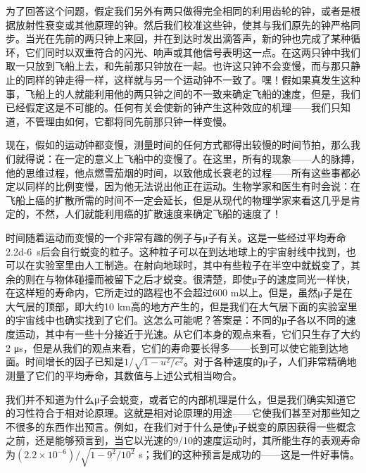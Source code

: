 \documentclass[12pt,oneside]{book}
\begin{document}
为了回答这个问题，假定我们另外有两只做得完全相同的利用齿轮的钟，或者是根据放射性衰变或其他原理的钟。然后我们校准这些钟，使其与我们原先的钟严格同步。当光在先前的两只钟上来回，并在到达时发出滴答声，新的钟也完成了某种循环，它们同时以双重符合的闪光、响声或其他信号表明这一点。在这两只钟中我们取一只放到飞船上去，和先前那只钟放在一起。也许这只钟不会变慢，而与那只静止的同样的钟走得一样，这样就与另一个运动钟不一致了。嘿！假如果真发生这种事，飞船上的人就能利用他的两只钟之间的不一致来确定飞船的速度，但是，我们已经假定这是不可能的。任何有关会使新的钟产生这种效应的机理——我们只知道，不管理由如何，它都将同先前那只钟一样变慢。

现在，假如的运动钟都变慢，测量时间的任何方式都得出较慢的时间节拍，那么我们就得说：在一定的意义上飞船中的变慢了。在这里，所有的现象——人的脉搏，他的思维过程，他点燃雪茄烟的时间，以致他成长衰老的过程——所有这些事都必定以同样的比例变慢，因为他无法说出他正在运动。生物学家和医生有时会说：在飞船上癌的扩散所需的时间不一定会延长，但是从现代的物理学家来看这几乎是肯定的，不然，人们就能利用癌的扩散速度来确定飞船的速度了！

时间随着运动而变慢的一个非常有趣的例子与μ子有关。这是一些经过平均寿命\qty{2.2d-6}{s}后会自行蜕变的粒子。这种粒子可以在到达地球上的宇宙射线中找到，也可以在实验室里由人工制造。在射向地球时，其中有些粒子在半空中就蜕变了，其余的则在与物体碰撞而被留下之后才蜕变。很清楚，即使μ子的速度同光一样快，在这样短的寿命内，它所走过的路程也不会超过600 m以上。但是，虽然μ子是在大气层的顶部，即大约10 km高的地方产生的，但是我们在大气层下面的实验室里的宇宙线中也确实找到了它们。这怎么可能呢？答案是：不同的μ子各以不同的速度运动，其中有一些十分接近于光速。从它们本身的观点来看，它们只生存了大约2 μs，但是从我们的观点来看，它们的寿命要长得多——长到可以使它能到达地面。时间增长的因子已知是$ 1/\sqrt{1 - u^2/c^2} $。对于各种速度的μ子，人们非常精确地测量了它们的平均寿命，其数值与上述公式相当吻合。

我们并不知道为什么μ子会蜕变，或者它的内部机理是什么，但是我们确实知道它的习性符合于相对论原理。这就是相对论原理的用途——它使我们甚至对那些知之不很多的东西作出预言。例如，在我们对于什么是使μ子蜕变的原因获得一些概念之前，还是能够预言到，当它以光速的9/10的速度运动时，其所能生存的表观寿命为$ (2.2\times10^{-6})/\sqrt{1 - 9^2/10^2} $ s；我们的这种预言是成功的——这是一件好事情。
\end{document}
